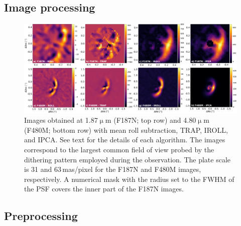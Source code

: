 \documentclass[longauth]{aa}
\newcommand{\vc}[1]{#1}
\begin{document}


\clearpage

\begin{appendix}

\section{Image processing}

    \begin{figure}[h]
    \centering
    \includegraphics[width=\textwidth]{FigA1_v4.pdf}
    \caption{Images obtained at 1.87$\upmu$m (F187N; top row) and 4.80$\upmu$m (F480M; bottom row) with mean roll subtraction, %
    TRAP, IROLL, and IPCA. See text for the details of each algorithm. The images correspond to the largest common field of view probed by the dithering pattern employed during the observation. The plate scale is 31 and 63\,mas/pixel for the F187N and F480M images, respectively. A numerical mask with the radius set to the FWHM of the PSF covers the inner part of the F187N images. %
    }
    \label{fig:AltAlgos}
    \end{figure}

\subsection{Preprocessing} \label{sec:preproc}


\end{appendix}
\end{document}
